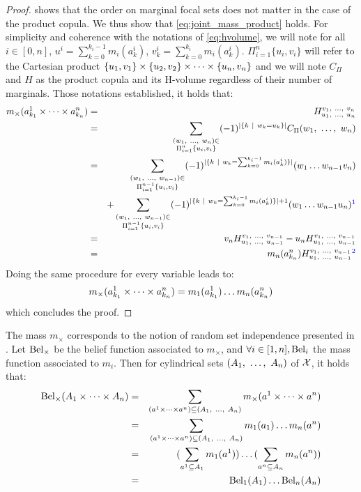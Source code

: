 \begin{proof}
     shows that the order on marginal focal sets does not matter in the case of the product copula. We thus show that \cref{eq:joint_mass_product} holds.
    For simplicity and coherence with the notations of \cref{eq:hvolume}, we will note for all $i\in[0,n]$, $u^i=\sum_{k=0}^{k_i-1}m_i(a_k^i)$, $v^i_k=\sum_{k=0}^{k_i}m_i(a_k^i)$. $\Pi_{i=1}^n\{u_i, v_i\}$ will refer to the Cartesian product $\{u_1, v_1\}\times\{u_2, v_2\}\times\dots\times\{u_n, v_n\}$ and we will note $C_\Pi$ and $H$ as the product copula and its H-volume regardless of their number of marginals. Those notations established, it holds that:
    \begin{eqnarray*}
        m_\times(a^1_{k_1}\tdt a^{n}_{k_{n}}) &=& H_{u_1 \enum u_{n}}^{v_1 \enum v_{n}}\\
        &=&\sum_{\substack{(w_1 \enum w_{n})\in\\\Pi_{i=1}^{n}\{u_i, v_i\}}}(-1)^{|\{k~|~w_k=u_k\}|}C_\Pi(w_1 \enum w_{n})\\
        &=&\sum_{\substack{(w_1 \enum w_{n-1})\in\\\Pi_{i=1}^{n-1}\{u_i, v_i\}}}(-1)^{|\{k~|~w_k=\sum_{k=0}^{k_i-1}m_i(a^i_k)\}|}(w_1 \dots w_{n-1}v_{n})\\
        && + \sum_{\substack{(w_1 \enum w_{n-1})\in\\\Pi_{i=1}^{n-1}\{u_i, v_i\}}}(-1)^{|\{k~|~w_k=\sum_{k=0}^{k_i-1}m_i(a^i_k)\}|+1}(w_1 \dots w_{n-1}u_n)\commanue{je ne suis pas sure de comprendre cette ligne}\\
        &=& v_{n}H_{u_1 \enum u_{n-1}}^{v_1 \enum v_{n-1}} - u_{n}H_{u_1 \enum u_{n-1}}^{v_1 \enum v_{n-1}}\\
        &=& m_{n}(a^{n}_{k_{n}})H_{u_1 \enum u_{n-1}}^{v_1 \enum v_{n-1}}\commanue{pareil pas compris}
    \end{eqnarray*}
    Doing the same procedure for every variable leads to:
    \begin{eqnarray*}
        m_\times(a^1_{k_1}\times\dots\times a^n_{k_n}) = m_1(a^1_{k_1})\dots m_n(a^n_{k_n})
    \end{eqnarray*}
    which concludes the proof.
\end{proof}

The mass $m_\times$ corresponds to the notion of random set independence presented in \cite{dempster_upper_1967, couso_survey_2000}. Let $\mathrm{Bel}_\times$ be the belief function associated to $m_\times$, and $\forall i\in[1,n], \mathrm{Bel}_i$ the mass function associated to $m_i$. Then for cylindrical sets $(A_1 , ~\dots, ~ A_n)$ of $\mathcal{X}$, it holds that:
\begin{eqnarray}
    \mathrm{Bel}_\times(A_1\times\dots\times A_n) &=& \sum_{(a^1\times\dots\times a^n)\subseteq (A_1 , ~\dots, ~ A_n)}m_\times(a^1\times\dots\times a^n)\nonumber\\
    &=& \sum_{(a^1\times\dots\times a^n)\subseteq (A_1 , ~\dots, ~ A_n)}m_1(a_1)\dots m_n(a^n)\nonumber\\
    &=& (\sum_{a^1\subseteq A_1}m_1(a^1))\dots(\sum_{a^n\subseteq A_n}m_n(a^n))\nonumber\\
    &=& \mathrm{Bel}_1(A_1)\dots \mathrm{Bel}_n(A_n)
\end{eqnarray}

